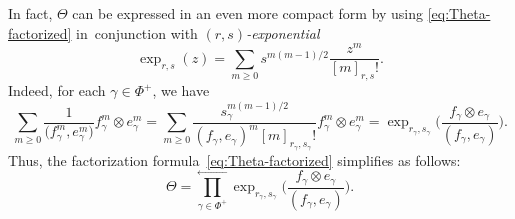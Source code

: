 \documentclass[10pt,a4paper]{amsart}
\numberwithin{equation}{section}
\begin{document}
\begin{Remark}%
In fact, $\Theta$ can be expressed in an even more compact form by using \eqref{eq:Theta-factorized} in~conjunction with \textit{$(r,s)$-exponential}
\begin{displaymath}
 \exp_{r,s}(z) = \sum_{m \ge 0}s^{m(m-1)/2} \frac{z^{m}}{[m]_{r,s}!}.
\end{displaymath}
Indeed, for each $\gamma \in \Phi^{+}$, we have
\begin{equation}\label{eq:local-exp}
 \sum_{m \ge 0} \frac{1}{\bigl(f_{\gamma}^{m},e_{\gamma}^{m}\bigr)}f_{\gamma}^{m} \otimes e_{\gamma}^{m} =
 \sum_{m \ge 0}\frac{s^{m(m - 1)/2}_\gamma}{(f_{\gamma},e_{\gamma})^{m}[m]_{r_{\gamma},s_{\gamma}}!}f_{\gamma}^{m} \otimes e_{\gamma}^{m}
 = \exp_{r_{\gamma},s_{\gamma}} \biggl(\frac{f_{\gamma} \otimes e_{\gamma}}{(f_{\gamma},e_{\gamma})}\biggr).
\end{equation}
Thus, the factorization formula~\eqref{eq:Theta-factorized} simplifies as follows:
\begin{displaymath}%
 \Theta = \overset{\longleftarrow}{\underset{\gamma \in \Phi^{+}}{\prod}}
 \exp_{r_{\gamma},s_{\gamma}}\biggl(\frac{f_{\gamma} \otimes e_{\gamma}}{(f_{\gamma},e_{\gamma})}\biggr).
\end{displaymath}
\end{Remark}
\end{document}
